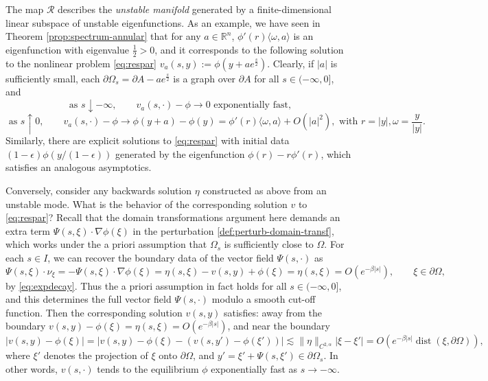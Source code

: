 \documentclass[11pt]{article}
\numberwithin{equation}{section}
\theoremstyle{definition}
\newcommand{\RR}{\mathbb{R}}
\DeclareMathOperator{\dist}{dist}
\begin{document}
The map $\mathscr{R}$ describes the \emph{unstable manifold} generated by a finite-dimensional linear subspace of unstable eigenfunctions.
As an example, we have seen in Theorem \ref{prop:spectrum-annular} that for any $a\in \RR^n$, $\phi'(r) \langle \omega, a\rangle$ is an eigenfunction with eigenvalue $\frac12>0$, and it corresponds to the following solution to the nonlinear problem \eqref{eq:respar} $v_a(s,y):= \phi(y+a e^{\frac{s}{2}})$. Clearly, if $|a|$ is sufficiently small, each $\partial \Omega_s = \partial A- a e^{\frac{s}{2}}$ is a graph over $\partial A$ for all $s\in (-\infty,0]$, and
\[ \text{ as }s \downarrow -\infty, \qquad v_a(s,\cdot) - \phi \to 0 \text{ exponentially fast,} \]
\[  \text{ as } s\uparrow 0, \qquad v_a(s,\cdot) - \phi \to \phi(y+a) - \phi(y) = \phi'(r) \langle \omega, a \rangle + O(|a|^2), \text{ with } r=|y|, \omega = \frac{y}{|y|}. \]
Similarly, there are explicit solutions to \eqref{eq:respar} with initial data $(1-\epsilon)\phi\left(y/(1-\epsilon) \right)$ generated by the eigenfunction $\phi(r)-r\phi'(r)$, which satisfies an analogous asymptotics.

Conversely, consider any backwards solution $\eta$ constructed as above from an unstable mode. What is the behavior of the corresponding solution $v$ to \eqref{eq:respar}? Recall that the domain transformations argument here demands an extra term $\Psi(s,\xi) \cdot \nabla \phi(\xi)$ in the perturbation \eqref{def:perturb-domain-transf}, which works under the a priori assumption that $\Omega_s$ is sufficiently close to $\Omega$. For each $s \in I$, we can recover the boundary data of the vector field $\Psi(s,\cdot)$ as
\[ \Psi(s,\xi) \cdot \nu_\xi = -\Psi(s,\xi) \cdot \nabla \phi(\xi) = \eta(s,\xi) - v(s,y) + \phi(\xi) = \eta(s,\xi) = O(e^{-\beta|s|}), \qquad \xi \in \partial\Omega,  \]
by \eqref{eq:expdecay}. 
Thus the a priori assumption in fact holds for all $s\in (-\infty,0]$, and this determines the full vector field $\Psi(s,\cdot)$ modulo a smooth cut-off function. Then the corresponding solution $v(s,y)$ satisfies: away from the boundary $v(s,y) - \phi(\xi) = \eta(s,\xi) = O(e^{-\beta|s|})$, and near the boundary 
\[ \left| v(s,y) - \phi(\xi) \right| = \left| v(s,y) - \phi(\xi) - (v(s,y') - \phi(\xi')) \right| \lesssim \|\eta\|_{C^{2,\alpha}} |\xi-\xi'| = O(e^{-\beta|s|}\dist(\xi,\partial\Omega)), \] 
where $\xi'$ denotes the projection of $\xi$ onto $\partial\Omega$, and $y' = \xi' + \Psi(s,\xi') \in \partial\Omega_s$. In other words, $v(s,\cdot)$ tends to the equilibrium $\phi$ exponentially fast as $s\to -\infty$.
\end{document}
